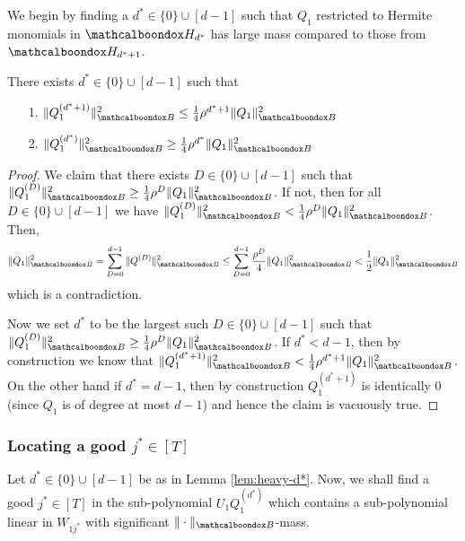 We begin by finding a $d^* \in \{0\} \cup [d-1]$ such that $Q_1$ restricted to Hermite monomials in $\mcb{H}_{d^*}$ has large mass compared to those from $\mcb{H}_{d^* + 1}$. 


\begin{lemma}				\label{lem:heavy-d*}
	There exists $d^* \in \{0\} \cup [d-1]$ such that 
	\begin{itemize}
		\item[1.]  $\|Q^{(d^*+1)}_1\|^2_\basisA \le \frac14\rho^{d^*+1}\|Q_1\|^2_\basisA$
		\item[2.] $\|Q^{(d^*)}_1\|^2_\basisA \ge \frac14\rho^{d^*}\|Q_1\|^2_\basisA$
	\end{itemize}
\end{lemma}
\begin{proof}
    We claim that there exists $D \in \{0\} \cup[d-1]$ such that $ \|Q^{(D)}_1\|^2_\basisA \ge \frac14\rho^{D}\|Q_1\|^2_\basisA$. If not, then for all $D \in \{0\} \cup [d-1]$ we have $ \|Q^{(D)}_1\|^2_\basisA <  \frac14\rho^{D}\|{Q}_1\|^2_\basisA$.  Then,
    \begin{equation*}
    \|Q_1\|^2_\basisA =  \sum_{D= 0}^{d-1} \|Q^{(D)}\|^2_\basisA \le \sum_{D= 0}^{d-1} \frac{\rho^{D}}{4}\|Q_1\|^2_\basisA < \frac{1}{2}\|Q_1\|^2_\basisA
    \end{equation*}
    \noindent which is a contradiction. 	

	Now we set $d^*$ to be the largest such $D \in \{0\} \cup [d-1]$ such that $\|Q^{(D)}_1\|^2_\basisA \ge \frac14 \rho^D\|Q_1\|^2_\basisA$. If $d^* < d-1$, then by construction we know that $\|Q^{(d^* + 1)}_1\|^2_\basisA < \frac14\rho^{d^* + 1}\|Q_1\|^2_\basisA$. On the other hand if $d^* = d - 1$, then by construction $Q^{(d^* + 1)}_1$ is identically $0$ (since $Q_1$ is of degree at most $d-1$) and hence the claim is vacuously true. 
\end{proof}


\subsubsection{Locating a good $j^* \in [T]$}


Let  $d^* \in \{0\} \cup [d-1]$ be as in Lemma \ref{lem:heavy-d*}. Now, we shall find a good $j^* \in [T]$ in the sub-polynomial $U_1Q_1^{(d^*)}$ which contains a sub-polynomial linear in $W_{1j^*}$ with significant $\|\cdot\|_\basisA$-mass. 



